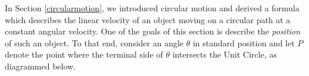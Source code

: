 \documentclass{ximera}
\begin{document}
	\author{Stitz-Zeager}




\setcounter{footnote}{0}

\label{TheCircularFunctionsSineandCosine}

In Section \ref{circularmotion}, we introduced circular motion and derived a formula which describes the linear velocity of an object moving on a circular path at a constant angular velocity.  One of the goals of this section is describe the \textit{position} of such an object.  To that end, consider an angle $\theta$ in standard position and let $P$ denote the point where the terminal side of $\theta$ intersects the Unit Circle, as diagrammed below.
\end{document}
